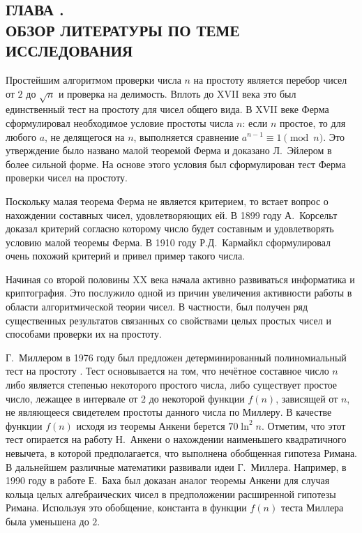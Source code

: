 \documentclass[_00_dissertation.tex]{subfiles}
\begin{document}
\onlyinsubfile{
    \renewcommand{\contentsname}{ОГЛАВЛЕНИЕ}
    \setcounter{tocdepth}{3}
    \tableofcontents
}

\begin{center}
    \chapter*{ГЛАВА .\\ ОБЗОР ЛИТЕРАТУРЫ ПО ТЕМЕ ИССЛЕДОВАНИЯ}\label{chapter:Literature_review}
\end{center}


Простейшим алгоритмом проверки числа $n$ на простоту является перебор чисел от $2$ до $\sqrt{n}$ и проверка на делимость.
Вплоть до XVII века это был единственный тест на простоту для чисел общего вида.
В XVII веке Ферма сформулировал необходимое условие простоты числа $n$: если $n$ простое, то для любого $a$, не делящегося на $n$, выполняется сравнение $a^{n-1} \equiv 1{\pmod{n}}$.
Это утверждение было названо малой теоремой Ферма и доказано Л.~Эйлером в более сильной форме.
На основе этого условия был сформулирован тест Ферма проверки чисел на простоту.

Поскольку малая теорема Ферма не является критерием, то встает вопрос о нахождении составных чисел, удовлетворяющих ей.
В 1899 году А.~Корсельт доказал критерий согласно которому число будет составным и удовлетворять условию малой теоремы Ферма.
В 1910 году Р.Д.~Кармайкл сформулировал очень похожий критерий и привел пример такого числа.

Начиная со второй половины XX века начала активно развиваться информатика и криптография.
Это послужило одной из причин увеличения активности работы в области алгоритмической теории чисел.
В частности, был получен ряд существенных результатов связанных со свойствами целых простых чисел и способами проверки их на простоту.

Г.~Миллером в 1976 году был предложен детерминированный полиномиальный тест на простоту \cite{source:Miller}.
Тест основывается на том, что нечётное составное число $n$ либо является степенью некоторого простого числа, либо существует простое число, лежащее в интервале от $2$ до некоторой функции $f(n)$, зависящей от $n$, не являющееся свидетелем простоты данного числа по Миллеру.
В качестве функции $f(n)$ исходя из теоремы Анкени берется $70 \ln^2 n$.
Отметим, что этот тест опирается на работу Н.~Анкени о нахождении наименьшего квадратичного невычета, в которой предполагается, что выполнена обобщенная гипотеза Римана.
В дальнейшем различные математики развивали идеи Г.~Миллера.
Например, в 1990 году в работе Е.~Баха \cite{source:Bach} был доказан аналог теоремы Анкени для случая кольца целых алгебраических чисел в предположении расширенной гипотезы Римана.
Используя это обобщение, константа в функции $f(n)$ теста Миллера была уменьшена до $2$.
\end{document}
